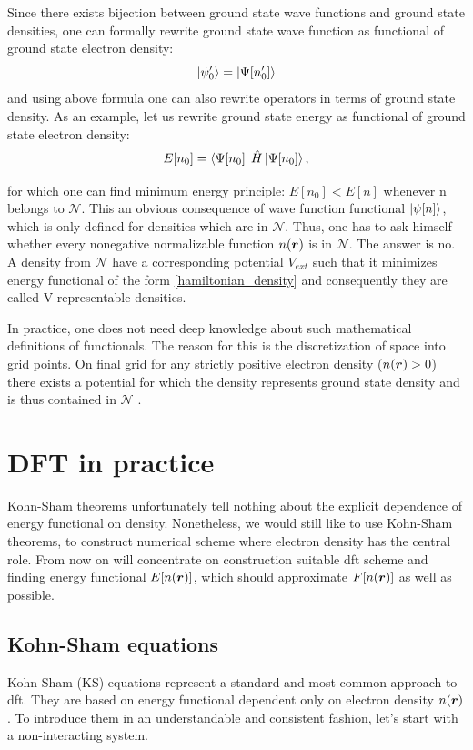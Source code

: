 \documentclass[openany, longbibliography,slovene,a4paper,12pt]{article}
\def\vec#1{\mbox{\boldmath$#1$}}
\begin{document}
Since there exists bijection between ground state wave functions and ground
state densities, one can formally rewrite ground state wave function as
functional of ground state electron density:
\begin{equation}
  \ket{\psi'_0} =  \ket{\Psi[n'_0]}
  \end{equation}
and using above formula one can also rewrite operators in terms of ground state
density. As an example, let us rewrite ground state energy as functional of
ground state electron density:
\begin{equation} \label{hamiltonian_density}
  E[n_0] = \bra{\Psi[n_0]}\hat H \ket{\Psi[n_0]},
  \end{equation}

for which one can find minimum energy principle: $E[n_0]<E[n]$ whenever n
belongs to $\mathcal N$. This an obvious consequence of wave function functional
$\ket{\psi [n]}$, which is only defined for densities which are in $\mathcal N$.
Thus, one has to ask himself whether every nonegative normalizable function
$n(\vec r)$ is in $\mathcal N$.  The answer is no. A density from $\mathcal N$
have a corresponding potential $V_{ext}$ such that it minimizes energy functional
of the form \ref{hamiltonian_density} and consequently they are called V-representable densities. 

In practice, one does not need deep knowledge about such mathematical
definitions of functionals. The reason for this is the discretization of space
into grid points. On final grid for any strictly positive electron density
($n(\vec r) > 0$) there exists a potential for which the density represents ground state density and is thus contained in $\mathcal N$ \cite{advanced_course}.


  \section{DFT in practice}
Kohn-Sham theorems unfortunately tell nothing about the explicit dependence of
energy functional on density. Nonetheless, we would still like to use Kohn-Sham
theorems, to construct numerical scheme where electron density has the central
role. From now on will concentrate on construction suitable dft scheme and finding energy functional $E[n(\vec r)]$,
which should approximate $F[n(\vec r)]$ as well as possible.
  
  \subsection{Kohn-Sham equations}
  Kohn-Sham (KS) equations represent a standard and most common approach to dft.
  They are based on energy functional dependent only on electron density $n(\vec
  r)$. To introduce them in an understandable and consistent fashion, let's start with a non-interacting system. 
 
\end{document}
